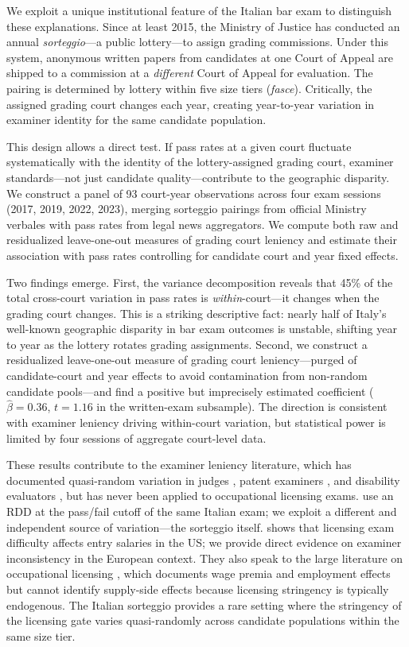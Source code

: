 \documentclass[11pt]{article}
\begin{document}
We exploit a unique institutional feature of the Italian bar exam to distinguish these explanations. Since at least 2015, the Ministry of Justice has conducted an annual \textit{sorteggio}---a public lottery---to assign grading commissions. Under this system, anonymous written papers from candidates at one Court of Appeal are shipped to a commission at a \textit{different} Court of Appeal for evaluation. The pairing is determined by lottery within five size tiers (\textit{fasce}). Critically, the assigned grading court changes each year, creating year-to-year variation in examiner identity for the same candidate population.

This design allows a direct test. If pass rates at a given court fluctuate systematically with the identity of the lottery-assigned grading court, examiner standards---not just candidate quality---contribute to the geographic disparity. We construct a panel of 93 court-year observations across four exam sessions (2017, 2019, 2022, 2023), merging sorteggio pairings from official Ministry verbales with pass rates from legal news aggregators. We compute both raw and residualized leave-one-out measures of grading court leniency and estimate their association with pass rates controlling for candidate court and year fixed effects.

Two findings emerge. First, the variance decomposition reveals that 45\% of the total cross-court variation in pass rates is \textit{within}-court---it changes when the grading court changes. This is a striking descriptive fact: nearly half of Italy's well-known geographic disparity in bar exam outcomes is unstable, shifting year to year as the lottery rotates grading assignments. Second, we construct a residualized leave-one-out measure of grading court leniency---purged of candidate-court and year effects to avoid contamination from non-random candidate pools---and find a positive but imprecisely estimated coefficient ($\hat{\beta} = 0.36$, $t = 1.16$ in the written-exam subsample). The direction is consistent with examiner leniency driving within-court variation, but statistical power is limited by four sessions of aggregate court-level data.

These results contribute to the examiner leniency literature, which has documented quasi-random variation in judges \citep{kling2006, dobbie2018, frandsen2023}, patent examiners \citep{farremensa2020}, and disability evaluators \citep{maestas2013}, but has never been applied to occupational licensing exams. \citet{bamieh2024} use an RDD at the pass/fail cutoff of the same Italian exam; we exploit a different and independent source of variation---the sorteggio itself. \citet{pagliero2019} shows that licensing exam difficulty affects entry salaries in the US; we provide direct evidence on examiner inconsistency in the European context. They also speak to the large literature on occupational licensing \citep{kleiner2013, blair2019}, which documents wage premia and employment effects but cannot identify supply-side effects because licensing stringency is typically endogenous. The Italian sorteggio provides a rare setting where the stringency of the licensing gate varies quasi-randomly across candidate populations within the same size tier.
\end{document}
